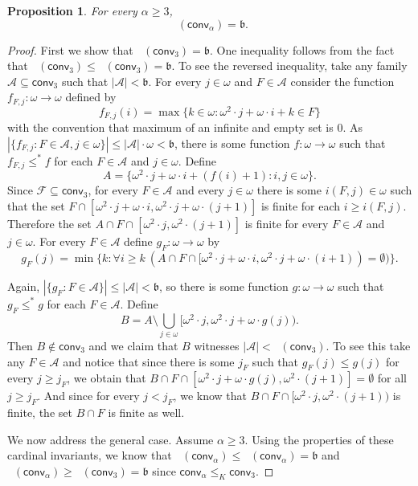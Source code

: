\documentclass{amsart}
\theoremstyle{plain}
\newtheorem{proposition}[theorem]{Proposition}
\theoremstyle{definition}
\theoremstyle{remark}
\newcommand{\cA}{\mathcal{A}}
\newcommand{\cF}{\mathcal{F}}
\newcommand{\bnumber}{\mathfrak{b}}
\DeclareMathOperator{\cov}{cov}
\DeclareMathOperator{\covs}{\cov^*}
\DeclareMathOperator{\covp}{\cov^*_+}
\newcommand{\conv}{\mathsf{conv}}
\renewcommand{\subset}{\subseteq}
\begin{document}
\begin{proposition}\label{prop:covp}
      For every $\alpha\geq3$,
    $$\covp(\conv_\alpha)=\bnumber.$$

\end{proposition}

\begin{proof}
First we show that $\covp(\conv_3)=\bnumber.$
    One inequality follows from the fact that $\covp(\conv_3)\leq\covs(\conv_3)=\bnumber$. To see the reversed inequality, take any family $\cA\subset \conv_3$ such that $|\cA|<\bnumber$. For every $j\in\omega$ and $F\in\cA$ consider the function $f_{F,j}:\omega\to\omega $ defined by 
    $$f_{F,j}(i)=\max\{k\in\omega: \omega^2\cdot j+\omega \cdot i+k\in F\} $$ 
    with the convention that maximum of an infinite and empty set is $0$. 
    As $|\{f_{F,j} : F\in\cA , j\in\omega\}|\leq |\cA|\cdot \omega<\bnumber$, there is some function $f:\omega\to\omega$ such that $f_{F,j}\leq^*f$ for each $F\in\cA$ and $j\in\omega$. Define 
    $$A=\{\omega^2\cdot j+\omega\cdot i+(f(i)+1): i,j\in\omega\}.$$
    Since $\cF\subset\conv_3$, for every $F\in\cA$ and every $j\in\omega$ there is some $i(F,j)\in\omega$ such that the set $F\cap [\omega^2\cdot j +\omega\cdot i, \omega^2\cdot j+\omega\cdot (j+1)]$ is finite for each $i\geq i(F,j)$. Therefore the set $A\cap F\cap [\omega^2\cdot j, \omega^2\cdot (j+1)]$ is finite for every $F\in\cA$ and $j\in\omega$.
    For every $F\in\cA$ define $g_F:\omega\to\omega$ by 
    $$g_F(j)=\min\{k : \forall i\geq k \ (A\cap F\cap [\omega^2\cdot j+\omega \cdot i, \omega^2 \cdot j +\omega\cdot (i+1))=\emptyset)\}.$$
    
    Again,  $|\{g_{F} : F\in\cA \}|\leq |\cA|<\bnumber$, so there is some function $g:\omega\to\omega$ such  that $g_F\leq^*g$ for each $F\in\cA$. Define $$B=A\setminus \bigcup_{j\in\omega}[\omega^2\cdot j , \omega^2\cdot j +\omega\cdot g(j)).$$ Then $B\not\in \conv_3$ and we claim that $B$ witnesses $|\cA|<\covp(\conv_3)$. To see this take any $F\in\cA$ and notice that since  there is some $j_F$ such that $g_F(j)\leq g(j)$ for every $j\geq j_F$, we obtain that $B\cap F\cap [\omega^2\cdot j +\omega\cdot g(j) , \omega^2\cdot (j+1)] =\emptyset$ for all $j\geq j_F$. And since for every $j<j_F$, we know that $B\cap F\cap [\omega^2\cdot j, \omega^2\cdot (j+1))$ is finite, the set $B\cap F$ is finite as well.

    We now address the general case. Assume $\alpha\geq 3$. Using the properties of these cardinal invariants, we know that  $\covp(\conv_\alpha)\leq\covs(\conv_\alpha)=\bnumber$ and $\covp(\conv_\alpha)\geq\covp(\conv_3)=\bnumber$ since  $\conv_\alpha\leq_K\conv_3$.
\end{proof}









\end{document}
